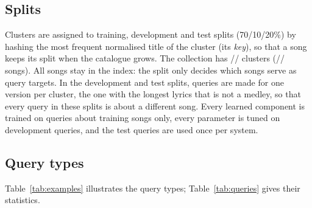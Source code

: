 \documentclass[11pt]{article}
\begin{document}
\subsection{Splits}\label{sec:splits}
Clusters are assigned to training, development and test splits (70/10/20\%) by hashing the most frequent
normalised title of the cluster (its \emph{key}), so that a song keeps its split when the catalogue grows.
The collection has \NTrainClusters/\NDevClusters/\NTestClusters{} clusters
(\NTrainSongs/\NDevSongs/\NTestSongs{} songs). All songs stay in the index: the split only decides which
songs serve as query targets. In the development and test splits, queries are made for one version per
cluster, the one with the longest lyrics that is not a medley, so that every query in these splits is
about a different song. Every learned component is trained on queries about training songs only, every
parameter is tuned on development queries, and the test queries are used once per system.

\subsection{Query types}\label{sec:qtypes}
Table~\ref{tab:examples} illustrates the query types; Table~\ref{tab:queries} gives their statistics.
\end{document}
